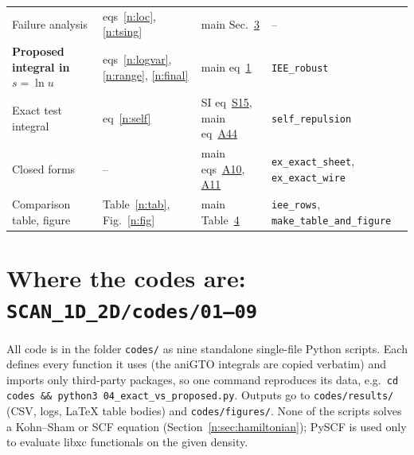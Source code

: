 \documentclass[11pt]{article}
\begin{document}
\begin{table}[H]
\begin{tabular}{@{}p{4.3cm}p{3.1cm}p{3.2cm}p{4.5cm}@{}}
Failure analysis & eqs~\ref{n:loc}, \ref{n:tsing} & main Sec.~\href{main.pdf\#section.3}{3} & -- \\
\textbf{Proposed integral in $s=\ln u$} & eqs~\ref{n:logvar}, \ref{n:range}, \ref{n:final} & main eq~\href{main.pdf\#equation.1}{1} & \texttt{IEE\_robust} \\
Exact test integral & eq~\ref{n:self} & SI eq~\href{si.pdf\#equation.15}{S15}, main eq~\href{main.pdf\#equation.44}{A44} & \texttt{self\_repulsion} \\
Closed forms & -- & main eqs~\href{main.pdf\#equation.10}{A10}, \href{main.pdf\#equation.11}{A11} & \texttt{ex\_exact\_sheet}, \texttt{ex\_exact\_wire} \\
Comparison table, figure & Table~\ref{n:tab}, Fig.~\ref{n:fig} & main Table~\href{main.pdf\#table.4}{4} & \texttt{iee\_rows}, \texttt{make\_table\_and\_figure} \\
\bottomrule
\end{tabular}
\end{table}

\section{Where the codes are: \texttt{SCAN\_1D\_2D/codes/01--09}}
\label{n:sec:codes}
All code is in the folder \texttt{codes/} as nine standalone single-file Python scripts.  Each defines every
function it uses (the aniGTO integrals are copied verbatim) and imports only third-party packages, so one
command reproduces its data, e.g.\ \texttt{cd codes \&\& python3 04\_exact\_vs\_proposed.py}.  Outputs go to
\texttt{codes/results/} (CSV, logs, \LaTeX{} table bodies) and \texttt{codes/figures/}.  None of the scripts
solves a Kohn--Sham or SCF equation (Section~\ref{n:sec:hamiltonian}); PySCF is used only to evaluate libxc
functionals on the given density.
\end{document}
